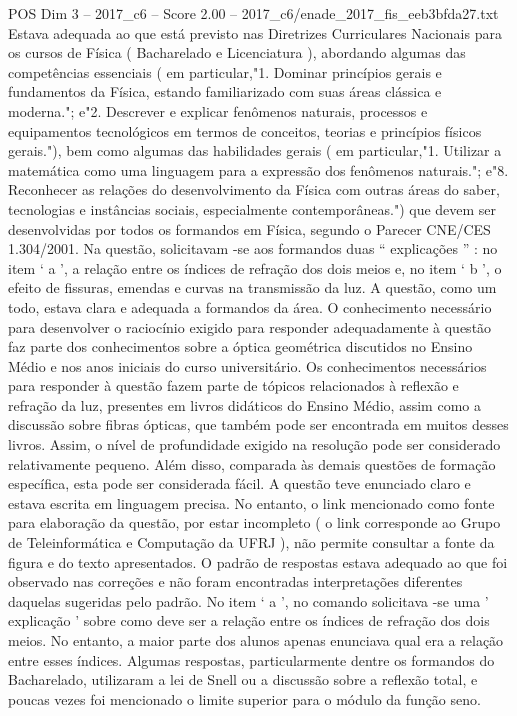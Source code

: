 \begin{textsample}{POS Dim 3 – 2017\_c6 – Score 2.00 – 2017\_c6/enade\_2017\_fis\_eeb3bfda27.txt}
Estava adequada ao que está previsto nas Diretrizes Curriculares Nacionais para os cursos de Física ( Bacharelado e Licenciatura ), abordando algumas das competências essenciais ( em particular,"1.
Dominar princípios gerais e fundamentos da Física, estando familiarizado com suas áreas clássica e moderna."; e"2.
Descrever e explicar fenômenos naturais, processos e equipamentos tecnológicos em termos de conceitos, teorias e princípios físicos gerais."), bem como algumas das habilidades gerais ( em particular,"1.
Utilizar a matemática como uma linguagem para a expressão dos fenômenos naturais."; e"8.
Reconhecer as relações do desenvolvimento da Física com outras áreas do saber, tecnologias e instâncias sociais, especialmente contemporâneas.") que devem ser desenvolvidas por todos os formandos em Física, segundo o Parecer CNE/CES 1.304/2001.
Na questão, solicitavam -se aos formandos duas “ explicações ” : no item ‘ a ’, a relação entre os índices de refração dos dois meios e, no item ‘ b ’, o efeito de fissuras, emendas e curvas na transmissão da luz.
A questão, como um todo, estava clara e adequada a formandos da área.
O conhecimento necessário para desenvolver o raciocínio exigido para responder adequadamente à questão faz parte dos conhecimentos sobre a óptica geométrica discutidos no Ensino Médio e nos anos iniciais do curso universitário.
Os conhecimentos necessários para responder à questão fazem parte de tópicos relacionados à reflexão e refração da luz, presentes em livros didáticos do Ensino Médio, assim como a discussão sobre fibras ópticas, que também pode ser encontrada em muitos desses livros.
Assim, o nível de profundidade exigido na resolução pode ser considerado relativamente pequeno.
Além disso, comparada às demais questões de formação específica, esta pode ser considerada fácil.
A questão teve enunciado claro e estava escrita em linguagem precisa.
No entanto, o link mencionado como fonte para elaboração da questão, por estar incompleto ( o link corresponde ao Grupo de Teleinformática e Computação da UFRJ ), não permite consultar a fonte da figura e do texto apresentados.
O padrão de respostas estava adequado ao que foi observado nas correções e não foram encontradas interpretações diferentes daquelas sugeridas pelo padrão.
No item ‘ a ’, no comando solicitava -se uma ' explicação ' sobre como deve ser a relação entre os índices de refração dos dois meios.
No entanto, a maior parte dos alunos apenas enunciava qual era a relação entre esses índices.
Algumas respostas, particularmente dentre os formandos do Bacharelado, utilizaram a lei de Snell ou a discussão sobre a reflexão total, e poucas vezes foi mencionado o limite superior para o módulo da função seno.

\end{textsample}
